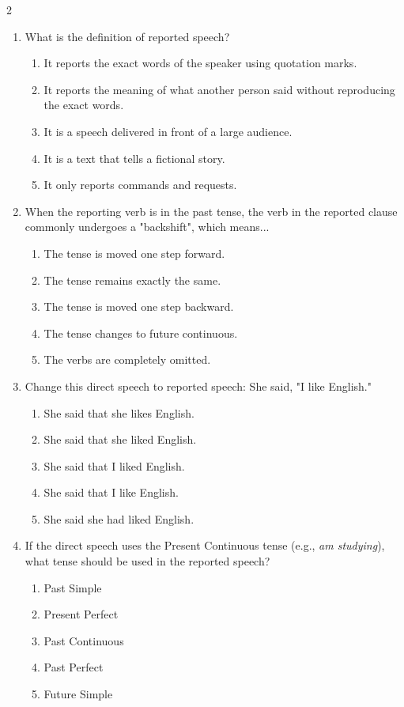 \documentclass[10pt,a4paper]{article}
\begin{document}
\begin{multicols}{2}
\begin{enumerate}
    \item What is the definition of reported speech?
    \begin{enumerate}
      \item It reports the exact words of the speaker using quotation marks.
      \item It reports the meaning of what another person said without reproducing the exact words.
      \item It is a speech delivered in front of a large audience.
      \item It is a text that tells a fictional story.
      \item It only reports commands and requests.
    \end{enumerate}

    \item When the reporting verb is in the past tense, the verb in the reported clause commonly undergoes a "backshift", which means...
    \begin{enumerate}
      \item The tense is moved one step forward.
      \item The tense remains exactly the same.
      \item The tense is moved one step backward.
      \item The tense changes to future continuous.
      \item The verbs are completely omitted.
    \end{enumerate}

    \item Change this direct speech to reported speech: She said, "I like English."
    \begin{enumerate}
      \item She said that she likes English.
      \item She said that she liked English.
      \item She said that I liked English.
      \item She said that I like English.
      \item She said she had liked English.
    \end{enumerate}

    \item If the direct speech uses the Present Continuous tense (e.g., \textit{am studying}), what tense should be used in the reported speech?
    \begin{enumerate}
      \item Past Simple
      \item Present Perfect
      \item Past Continuous
      \item Past Perfect
      \item Future Simple
    \end{enumerate}


\end{enumerate}
\end{multicols}
\end{document}
